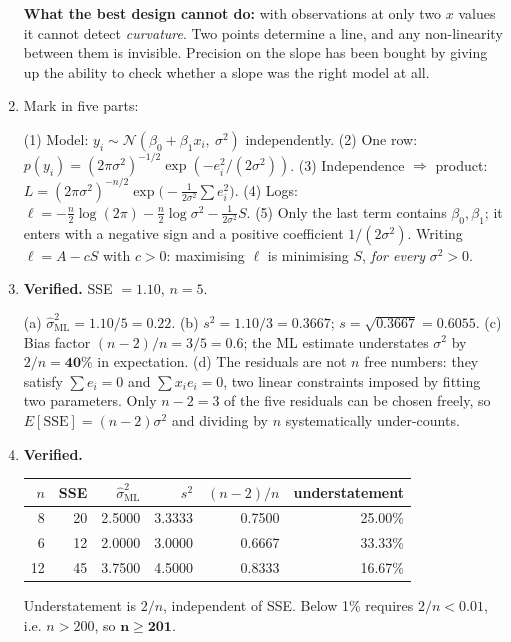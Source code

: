 \documentclass[11pt,a4paper]{article}
\newcommand{\A}[1]{\item[\textbf{#1}]}
\begin{document}
\begin{enumerate}[leftmargin=1.9cm]
\begin{answerbox}
\textbf{What the best design cannot do:} with observations at only two $x$
values it cannot detect \emph{curvature}. Two points determine a line, and any
non-linearity between them is invisible. Precision on the slope has been bought
by giving up the ability to check whether a slope was the right model at all.
\end{answerbox}

\A{U5.51} Mark in five parts:
\begin{answerbox}
(1) Model: $y_i \sim \mathcal N(\beta_0+\beta_1x_i,\ \sigma^2)$ independently.
(2) One row: $p(y_i) = (2\pi\sigma^2)^{-1/2}\exp(-e_i^2/(2\sigma^2))$.
(3) Independence $\Rightarrow$ product:
$L = (2\pi\sigma^2)^{-n/2}\exp\!\big(-\frac{1}{2\sigma^2}\sum e_i^2\big)$.
(4) Logs: $\ell = -\frac n2\log(2\pi) - \frac n2\log\sigma^2 -
\frac{1}{2\sigma^2}S$.
(5) Only the last term contains $\beta_0,\beta_1$; it enters with a negative
sign and a positive coefficient $1/(2\sigma^2)$. Writing $\ell = A - cS$ with
$c > 0$: maximising $\ell$ is minimising $S$, \emph{for every} $\sigma^2 > 0$.
\end{answerbox}

\A{U5.52} \textbf{Verified.} SSE $= 1.10$, $n = 5$.
\begin{answerbox}
(a) $\hat\sigma^2_{\text{ML}} = 1.10/5 = \mathbf{0.22}$.
(b) $s^2 = 1.10/3 = \mathbf{0.3667}$; $s = \sqrt{0.3667} = \mathbf{0.6055}$.
(c) Bias factor $(n-2)/n = 3/5 = \mathbf{0.6}$; the ML estimate understates
$\sigma^2$ by $2/n = \mathbf{40\%}$ in expectation.
(d) The residuals are not $n$ free numbers: they satisfy $\sum e_i = 0$ and
$\sum x_ie_i = 0$, two linear constraints imposed by fitting two parameters.
Only $n-2 = 3$ of the five residuals can be chosen freely, so
$E[\text{SSE}] = (n-2)\sigma^2$ and dividing by $n$ systematically
under-counts.
\end{answerbox}

\A{U5.53} \textbf{Verified.}
\begin{answerbox}
\begin{center}\begin{tabular}{@{}rrrrrr@{}}\toprule
$n$ & SSE & $\hat\sigma^2_{\text{ML}}$ & $s^2$ & $(n-2)/n$ & understatement\\
\midrule
8 & 20 & 2.5000 & 3.3333 & 0.7500 & 25.00\%\\
6 & 12 & 2.0000 & 3.0000 & 0.6667 & 33.33\%\\
12 & 45 & 3.7500 & 4.5000 & 0.8333 & 16.67\%\\
\bottomrule\end{tabular}\end{center}
Understatement is $2/n$, independent of SSE. Below 1\% requires
$2/n < 0.01$, i.e. $n > 200$, so $\mathbf{n \ge 201}$.
\end{answerbox}


\end{enumerate}
\end{document}

